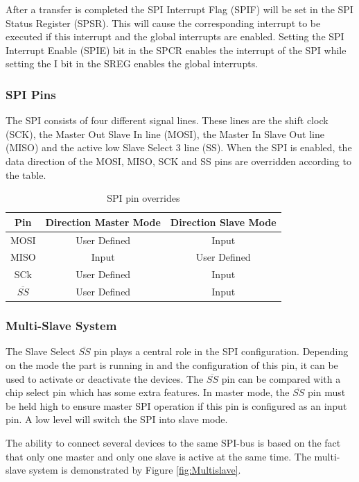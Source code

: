 After a transfer is completed the SPI Interrupt Flag (SPIF) will be set in the SPI Status Register (SPSR). This will cause the corresponding interrupt to be executed if this interrupt and the global interrupts are enabled. Setting the SPI Interrupt Enable (SPIE) bit in the SPCR enables the interrupt of the SPI while setting the I bit in the SREG enables the global interrupts.

\subsubsection{SPI Pins}
The SPI consists of four different signal lines. These lines are the shift clock (SCK), the Master Out Slave In line (MOSI), the Master In Slave Out line (MISO) and the active low Slave Select 3 line (SS). When the SPI is enabled, the data direction of the MOSI, MISO, SCK and SS pins are overridden according to the table.
\begin{table}[htpb]
\centering
\caption{SPI pin overrides}
\label{tab:Pinoverrides}
\begin{tabular}{|c|c|c|}
\hline 
Pin & Direction Master Mode & Direction Slave Mode \\ 
\hline 
MOSI & User Defined & Input \\ 
\hline 
MISO & Input & User Defined \\ 
\hline 
SCk & User Defined & Input \\ 
\hline 
$\overline{SS}$ & User Defined & Input \\ 
\hline 
\end{tabular} 
\end{table}

\subsubsection{Multi-Slave System}
The Slave Select $\overline{SS}$ pin plays a central role in the SPI configuration. Depending on the mode the part is running in and the configuration of this pin, it can be used to activate or deactivate the devices. The $\overline{SS}$ pin can be compared with a chip select pin which has some extra features. In master mode, the $\overline{SS}$ pin must be held high to ensure master SPI operation if this pin is configured as an input pin. A low level will switch the SPI into slave mode.

The ability to connect several devices to the same SPI-bus is based on the fact that only one master and only one slave is active at the same time. The multi-slave system is demonstrated by Figure \ref{fig:Multislave}.

